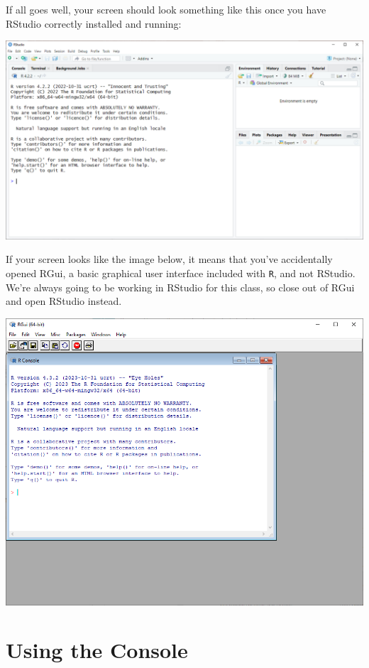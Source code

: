 \documentclass[
]{book}
\begin{document}
If all goes well, your screen should look something like this once you have RStudio correctly installed and running:

\includegraphics{docs/_main_files/figure-html/RStudio clean install.png}

If your screen looks like the image below, it means that you've accidentally opened RGui, a basic graphical user interface included with \texttt{R}, and not RStudio. We're always going to be working in RStudio for this class, so close out of RGui and open RStudio instead.

\includegraphics{docs/_main_files/figure-html/Base R GUI.PNG}

\hypertarget{using-the-console}{%
\section{Using the Console}\label{using-the-console}}
\end{document}

